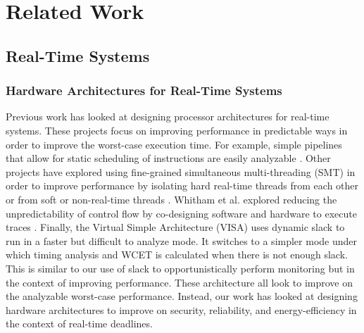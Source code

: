 \chapter{Related Work}
\label{chap:related_work}

\section{Real-Time Systems}
\label{sec:related_work.realtime}

\subsection{Hardware Architectures for Real-Time Systems}

Previous work has looked at designing processor architectures for real-time
systems. These projects focus on improving performance in predictable ways in
order to improve the worst-case execution time. For example, simple pipelines
that allow for static scheduling of instructions are easily analyzable
\cite{spear-ecrts03, mcgrep-rtss06, jop-jsa07, patmos-ppes2011}. Other projects
have explored using fine-grained simultaneous multi-threading (SMT) in order to
improve performance by isolating hard real-time threads from each other
\cite{pret-dac07, pret-cases08, ptarm-iccd12} or from soft or non-real-time
threads \cite{merasa-micro10, carcores-arcs10, flexpret-rtas14}. Whitham et al.
explored reducing the unpredictability of control flow by co-designing software
and hardware to execute traces \cite{whitham-comp10}. Finally, the Virtual
Simple Architecture (VISA) \cite{visa-isca03, multi_task_visa-rtss04} uses
dynamic slack to run in a faster but difficult to analyze mode. It switches to
a simpler mode under which timing analysis and WCET is calculated when there is
not enough slack. This is similar to our use of slack to opportunistically
perform monitoring but in the context of improving performance.
These architecture all look to improve on the analyzable worst-case
performance. Instead, our work has looked at designing hardware architectures
to improve on security, reliability, and energy-efficiency in the context of
real-time deadlines.

%

